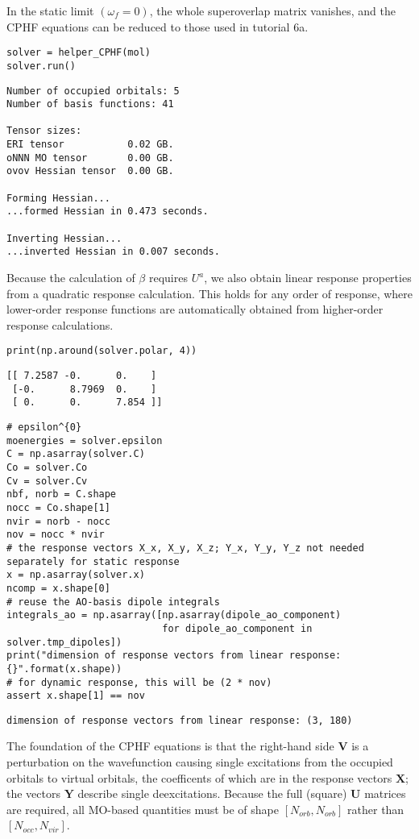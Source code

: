 In the static limit \((\omega_f = 0)\), the whole superoverlap matrix vanishes, and the CPHF equations can be reduced to those used in tutorial 6a.

\begin{verbatim}
solver = helper_CPHF(mol)
solver.run()
\end{verbatim}
\begin{verbatim}
Number of occupied orbitals: 5
Number of basis functions: 41

Tensor sizes:
ERI tensor           0.02 GB.
oNNN MO tensor       0.00 GB.
ovov Hessian tensor  0.00 GB.

Forming Hessian...
...formed Hessian in 0.473 seconds.

Inverting Hessian...
...inverted Hessian in 0.007 seconds.
\end{verbatim}
Because the calculation of \(\beta\) requires \(U^{a}\), we also obtain linear response properties from a quadratic response calculation. This holds for any order of response, where lower-order response functions are automatically obtained from higher-order response calculations.

\begin{verbatim}
print(np.around(solver.polar, 4))
\end{verbatim}
\begin{verbatim}
[[ 7.2587 -0.      0.    ]
 [-0.      8.7969  0.    ]
 [ 0.      0.      7.854 ]]
\end{verbatim}
\begin{verbatim}
# epsilon^{0}
moenergies = solver.epsilon
C = np.asarray(solver.C)
Co = solver.Co
Cv = solver.Cv
nbf, norb = C.shape
nocc = Co.shape[1]
nvir = norb - nocc
nov = nocc * nvir
# the response vectors X_x, X_y, X_z; Y_x, Y_y, Y_z not needed separately for static response
x = np.asarray(solver.x)
ncomp = x.shape[0]
# reuse the AO-basis dipole integrals
integrals_ao = np.asarray([np.asarray(dipole_ao_component)
                           for dipole_ao_component in solver.tmp_dipoles])
print("dimension of response vectors from linear response: {}".format(x.shape))
# for dynamic response, this will be (2 * nov)
assert x.shape[1] == nov
\end{verbatim}
\begin{verbatim}
dimension of response vectors from linear response: (3, 180)
\end{verbatim}
The foundation of the CPHF equations is that the right-hand side \(\mathbf{V}\) is a perturbation on the wavefunction causing single excitations from the occupied orbitals to virtual orbitals, the coefficents of which are in the response vectors \(\mathbf{X}\); the vectors \(\mathbf{Y}\) describe single deexcitations. Because the full (square) \(\mathbf{U}\) matrices are required, all MO-based quantities must be of shape \([N_{orb}, N_{orb}]\) rather than \([N_{occ}, N_{vir}]\).

